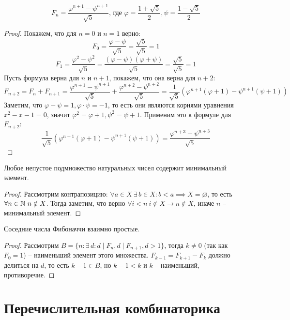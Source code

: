 \documentclass[12pt]{article}
\begin{document}
\begin{theorem}
	\[F_n=\frac{\varphi^{n+1}-\psi^{n+1}}{\sqrt{5}}\text{, где
	}\varphi=\frac{1+\sqrt{5}}{2}, \psi=\frac{1-\sqrt{5}}{2}\]	
	\begin{proof}
		Покажем, что для $n=0$ и $n=1$ верно:
		\[F_0=\frac{\varphi-\psi}{\sqrt{5}}=\frac{\sqrt{5}}{\sqrt{5}}=1\]		\[F_1=\frac{\varphi^2-\psi^2}{\sqrt{5}}=\frac{(\varphi-\psi)(\varphi+\psi)}{\sqrt{5}}=\frac{\sqrt{5}}{\sqrt{5}}=1\]		Пусть
		формула верна для $n$ и $n+1$, покажем, что она верна для $n+2$:
		\[F_{n+2}=F_{n}+F_{n+1}=\frac{\varphi^{n+1}-\psi^{n+1}}{\sqrt{5}}+\frac{\varphi^{n+2}-\psi^{n+2}}{\sqrt{5}}=\frac{1}{\sqrt{5}}\left(\varphi^{n+1}(\varphi+1)-\psi^{n+1}(\psi+1)\right)\]		Заметим,
		что $\varphi+\psi=1, \varphi\cdot\psi=-1$, то есть они
		являются корнями уравнения $x^2-x-1=0$, значит $\varphi^2=\varphi+1,
		\psi^2=\psi+1$. Применим это к формуле для $F_{n+2}$:
		\[\frac{1}{\sqrt{5}}\left(\varphi^{n+1}(\varphi+1)-\psi^{n+1}(\psi+1)\right)=\frac{\varphi^{n+3}-\psi^{n+3}}{\sqrt{5}}\]	
	\end{proof}
\end{theorem}
\begin{theorem}
	Любое непустое подмножество натуральных чисел содержит минимальный элемент.
	\begin{proof}
		Рассмотрим контрапозицию: $\forall a\in X\ \exists\,b\in X\colon
		b<a\implies X=\varnothing$, то есть $\forall n\in \mathbb{N}\ n\notin X$.
		Тогда заметим, что верно $\forall i<n\ i\notin X\to n\notin X$,
		иначе $n$ -- минимальный элемент.
	\end{proof}
\end{theorem}
\begin{statement}
	Соседние числа Фибоначчи взаимно простые.
	\begin{proof}
		Рассмотрим $B=\{n\colon \exists\, d\colon d\mid F_n, d\mid F_{n+1},
		d>1\}$, тогда $k\neq0$ (так как $F_0=1$) -- наименьший элемент
		этого множества. $F_{k-1}=F_{k+1}-F_k$ должно делиться на $d$, то
		есть $k-1\in B$, но $k-1<k$ и $k$ -- наименьший, противоречие.
	\end{proof}
\end{statement}

\section{Перечислительная комбинаторика}
\end{document}
